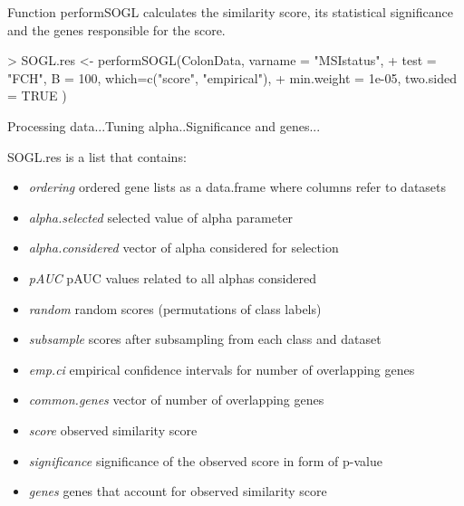 \documentclass[a4paper]{report}
\begin{document}
Function {\ttfamily performSOGL} calculates the similarity score, its statistical significance and the genes responsible for the score.
\begin{Schunk}
\begin{Sinput}
> SOGL.res <- performSOGL(ColonData, varname = "MSIstatus", 
+ test = "FCH", B = 100, which=c("score", "empirical"), 
+ min.weight = 1e-05, two.sided = TRUE )
\end{Sinput}
\begin{Soutput}
Processing data...Tuning alpha..Significance and genes...
\end{Soutput}
\end{Schunk}
{\ttfamily SOGL.res} is a list that contains:
\begin{itemize}
\item \emph{ordering} ordered gene lists as a data.frame where columns refer to datasets
\item \emph{alpha.selected} selected value of alpha parameter 
\item \emph{alpha.considered} vector of alpha considered for selection
\item \emph{pAUC} pAUC values related to all alphas considered
\item \emph{random} random scores (permutations of class labels)
\item \emph{subsample} scores after subsampling from each class and dataset
\item \emph{emp.ci} empirical confidence intervals for number of overlapping genes
\item \emph{common.genes} vector of number of overlapping genes
\item \emph{score} observed similarity score
\item \emph{significance} significance of the observed score in form of p-value
\item \emph{genes} genes that account for observed similarity score
\end{itemize}
\end{document}
